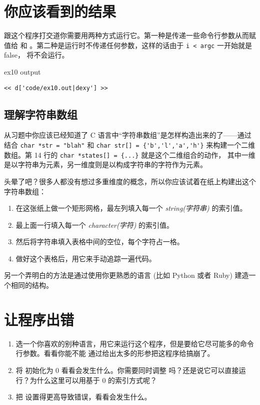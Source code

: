 \section{你应该看到的结果}

跟这个程序打交道你需要用两种方式运行它。第一种是传递一些命令行参数从而赋值给  和  。第二种是运行时不传递任何参数，这样的话由于 \verb|i < argc|
一开始就是 false， 将不会运行。

\begin{code}{ex10 output}
\begin{lstlisting}
<< d['code/ex10.out|dexy'] >>
\end{lstlisting}
\end{code}

\subsection{理解字符串数组}

从习题中你应该已经知道了 C 语言中“字符串数组”是怎样构造出来的了——通过结合
 \verb|char *str = "blah"| 和 \verb|char str[] = {'b','l','a','h'}| 
 来构建一个二维数组。第 14 行的 \verb|char *states[] = {...}| 就是这个二维组合的动作，
 其中一维是以字符串为元素，另一维度则是以构成字符串的字符作为元素。

头晕了吧？很多人都没有想过多重维度的概念，所以你应该试着在纸上构建出这个字符串数组：

\begin{enumerate}
\item 在这张纸上做一个矩形网格，最左列填入每一个 \emph{string(字符串)} 的索引值。
\item 最上面一行填入每一个 \emph{character(字符)} 的索引值。
\item 然后将字符串填入表格中间的空位，每个字符占一格。
\item 做好这个表格后，用它来手动追踪一遍代码。
\end{enumerate}

另一个弄明白的方法是通过使用你更熟悉的语言 (比如 Python 或者 Ruby) 建造一个相同的结构。

\section{让程序出错}

\begin{enumerate}
\item 选一个你喜欢的别种语言，用它来运行这个程序，但是要给它尽可能多的命令行参数。看看你能不能
通过给出太多的形参把这程序给搞崩了。
\item 将  初始化为 0 看看会发生什么。你需要同时调整  吗？还是说它可以直接运行？为什么这里可以用基于 0 的索引方式呢？
\item 把  设置得更高导致错误，看看会发生什么。
\end{enumerate}

